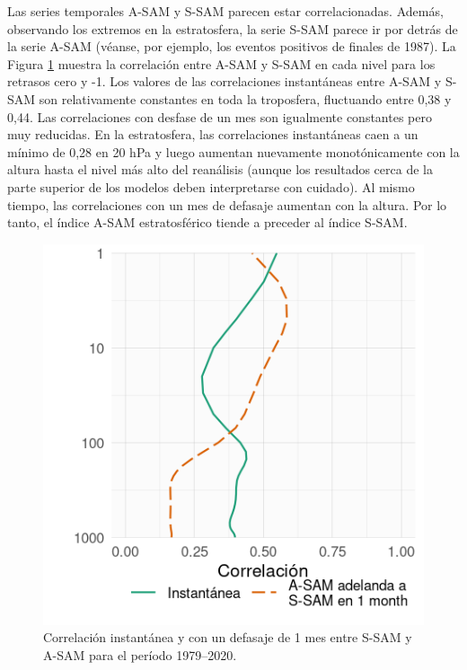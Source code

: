 \documentclass[12pt,oneside,a4paper]{reedthesis}
\begin{document}
Las series temporales A-SAM y S-SAM parecen estar correlacionadas.
Además, observando los extremos en la estratosfera, la serie S-SAM parece ir por detrás de la serie A-SAM (véanse, por ejemplo, los eventos positivos de finales de 1987).
La Figura \ref{fig:cor-lev} muestra la correlación entre A-SAM y S-SAM en cada nivel para los retrasos cero y -1.
Los valores de las correlaciones instantáneas entre A-SAM y S-SAM son relativamente constantes en toda la troposfera, fluctuando entre 0,38 y 0,44.
Las correlaciones con desfase de un mes son igualmente constantes pero muy reducidas.
En la estratosfera, las correlaciones instantáneas caen a un mínimo de 0,28 en 20 hPa y luego aumentan nuevamente monotónicamente con la altura hasta el nivel más alto del reanálisis (aunque los resultados cerca de la parte superior de los modelos deben interpretarse con cuidado).
Al mismo tiempo, las correlaciones con un mes de defasaje aumentan con la altura.
Por lo tanto, el índice A-SAM estratosférico tiende a preceder al índice S-SAM.



\begin{figure}

{\centering \includegraphics{figures/30-sam/cor-lev-1} 

}

\caption{Correlación instantánea y con un defasaje de 1 mes entre S-SAM y A-SAM para el período 1979--2020.}\label{fig:cor-lev}
\end{figure}
\end{document}
